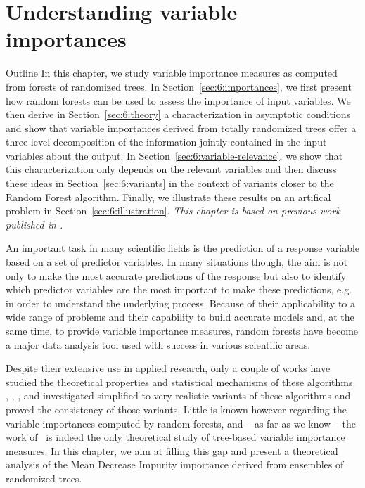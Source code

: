 \chapter{Understanding variable importances}\label{ch:importances}

\begin{remark}{Outline}
In this chapter, we study variable importance measures as computed from forests of
randomized trees. In Section~\ref{sec:6:importances}, we first present how
random forests can be used to assess the importance of input variables.  We
then derive in Section~\ref{sec:6:theory} a characterization in asymptotic
conditions and show that variable importances derived from totally randomized trees
offer a three-level decomposition of the information jointly  contained in the
input variables about the output. In Section~\ref{sec:6:variable-relevance}, we
show that this  characterization only depends on the relevant variables and
then discuss these ideas in Section~\ref{sec:6:variants} in the context of
variants closer to the Random Forest algorithm. Finally, we illustrate these
results on an artifical problem in Section~\ref{sec:6:illustration}.
\textit{This chapter is based on previous work published in \citep{louppe:2013}.}
\end{remark}

An important task in many scientific fields is the prediction of  a response
variable based on a set of predictor variables. In many situations though, the
aim is not only to make the most accurate predictions of the response but also
to identify which predictor variables are the most important to make these
predictions, e.g. in order to understand the underlying process. Because of
their applicability to a wide range of problems and their capability to
build accurate models and, at the same time, to provide variable importance
measures, random forests have become a major data analysis tool used with
success in various scientific areas.

Despite their extensive use in applied research, only a couple of works have
studied the theoretical properties and statistical mechanisms of these
algorithms. \citet{zhao:2000}, \citet{breiman:2004},
\citet{biau:2008,biau:2012}, \citet{meinshausen:2006} and \citet{lin:2006}
investigated simplified to very realistic variants of these algorithms and
proved  the consistency of those variants. Little is known however regarding
the variable importances computed by random forests, and -- as far as we know
-- the work of~\citet{ishwaran:2007} is indeed the only theoretical study of
tree-based variable importance measures. In this chapter, we aim at filling
this gap and present a theoretical  analysis of the Mean Decrease Impurity
importance derived from ensembles of randomized trees.



